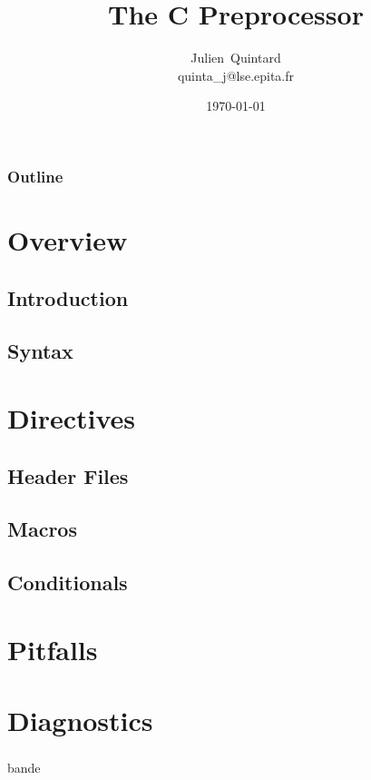 \documentclass{beamer}
\title{The C Preprocessor}
\author
{
  Julien~Quintard\inst{1} \\
  {\tiny quinta\_j@lse.epita.fr}
}
\institute
{
  \inst{1} EPITA Computer System Laboratory
}
\date{\today}
\begin{document}
%
%

\begin{frame}
  \titlepage
\end{frame}

%
%

\begin{frame}
  \frametitle{Outline}
  \tableofcontents
\end{frame}

%
%

\section{Overview}

\subsection{Introduction}

\subsection{Syntax}

\section{Directives}

\subsection{Header Files}

\subsection{Macros}

\subsection{Conditionals}

\section{Pitfalls}

\section{Diagnostics}

\begin{frame}
  \frametitle{}

  bande
\end{frame}
\end{document}
